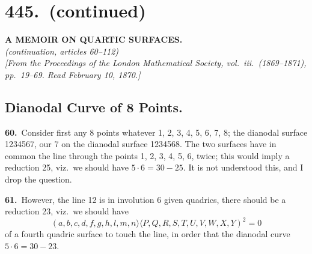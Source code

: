 \documentclass[11pt,a4paper]{article}
\newcommand{\bw}{\mathrel{\rangle\!\langle}}
\begin{document}
\setcounter{page}{154}

\section*{445.\ (continued)}
\begin{center}
\Large\textbf{A MEMOIR ON QUARTIC SURFACES.}\\[0.3em]
\normalsize\textit{(continuation, articles 60--112)}\\[0.3em]
\small\textit{[From the Proceedings of the London Mathematical Society, vol.\ iii.\ (1869--1871), pp.\ 19--69. Read February 10, 1870.]}
\end{center}

\setcounter{section}{59}

\medskip

\newpage
\setcounter{page}{155}

\subsection*{Dianodal Curve of 8 Points.}

\noindent\textbf{60.}\ Consider first any 8 points whatever 1, 2, 3, 4, 5, 6, 7, 8; the dianodal surface 1234567, our 7 on the dianodal surface 1234568. The two surfaces have in common the line through the points 1, 2, 3, 4, 5, 6, twice; this would imply a reduction 25, viz.\ we should have $5 \cdot 6 = 30 - 25$. It is not understood this, and I drop the question.

\medskip

\textbf{61.}\ However, the line 12 is in involution 6 given quadrics, there should be a reduction 23, viz.\ we should have
\[
(a, b, c, d, f, g, h, l, m, n \bw P, Q, R, S, T, U, V, W, X, Y)^2 = 0
\]
of a fourth quadric surface to touch the line, in order that the dianodal curve $5 \cdot 6 = 30 - 23$.

\medskip
\end{document}
